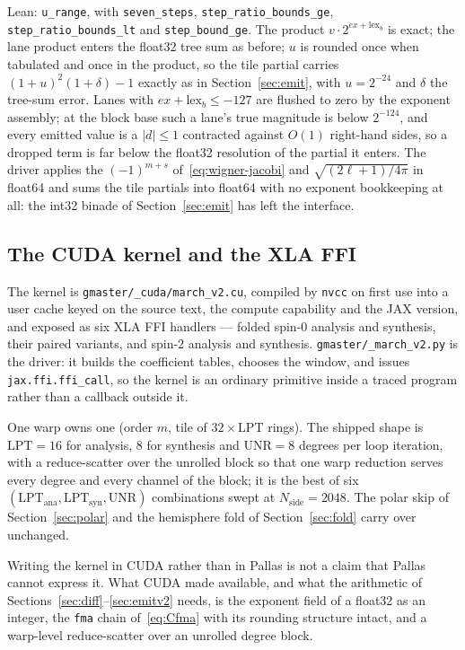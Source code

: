 \documentclass[usenatbib,useAMS]{mnras}
\begin{document}
Lean: \texttt{u\_range}, with \texttt{seven\_steps}, \texttt{step\_ratio\_bounds\_ge}, \texttt{step\_ratio\_bounds\_lt} and \texttt{step\_bound\_ge}. The product $v\cdot2^{ex+\mathrm{lex}_b}$ is exact; the lane product enters the float32 tree sum as before; $u$ is rounded once when tabulated and once in the product, so the tile partial carries $(1+u)^2(1+\delta)-1$ exactly as in Section~\ref{sec:emit}, with $u=2^{-24}$ and $\delta$ the tree-sum error. Lanes with $ex+\mathrm{lex}_b\le-127$ are flushed to zero by the exponent assembly; at the block base such a lane's true magnitude is below $2^{-124}$, and every emitted value is a $\lvert d\rvert\le1$ contracted against $O(1)$ right-hand sides, so a dropped term is far below the float32 resolution of the partial it enters. The driver applies the $(-1)^{m+s}$ of~\eqref{eq:wigner-jacobi} and $\sqrt{(2\ell+1)/4\pi}$ in float64 and sums the tile partials into float64 with no exponent bookkeeping at all: the int32 binade of Section~\ref{sec:emit} has left the interface.

\subsection{The CUDA kernel and the XLA FFI}
\label{sec:cuda}

The kernel is \texttt{gmaster/\_cuda/march\_v2.cu}, compiled by \texttt{nvcc} on first use into a user cache keyed on the source text, the compute capability and the JAX version, and exposed as six XLA FFI handlers --- folded spin-$0$ analysis and synthesis, their paired variants, and spin-$2$ analysis and synthesis. \texttt{gmaster/\_march\_v2.py} is the driver: it builds the coefficient tables, chooses the window, and issues \texttt{jax.ffi.ffi\_call}, so the kernel is an ordinary primitive inside a traced program rather than a callback outside it.

One warp owns one (order $m$, tile of $32\times\mathrm{LPT}$ rings). The shipped shape is $\mathrm{LPT}=16$ for analysis, $8$ for synthesis and $\mathrm{UNR}=8$ degrees per loop iteration, with a reduce-scatter over the unrolled block so that one warp reduction serves every degree and every channel of the block; it is the best of six $(\mathrm{LPT}_{\mathrm{ana}},\mathrm{LPT}_{\mathrm{syn}},\mathrm{UNR})$ combinations swept at $N_{\mathrm{side}}=2048$. The polar skip of Section~\ref{sec:polar} and the hemisphere fold of Section~\ref{sec:fold} carry over unchanged.

Writing the kernel in CUDA rather than in Pallas is not a claim that Pallas cannot express it. What CUDA made available, and what the arithmetic of Sections~\ref{sec:diff}--\ref{sec:emitv2} needs, is the exponent field of a float32 as an integer, the \texttt{fma} chain of~\eqref{eq:Cfma} with its rounding structure intact, and a warp-level reduce-scatter over an unrolled degree block.
\end{document}
